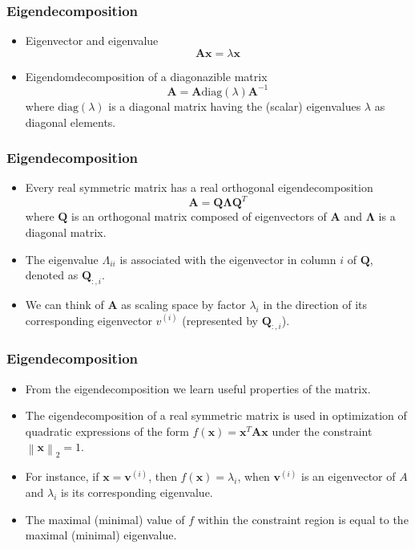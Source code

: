 \documentclass[notes]{beamer}          %
\newcommand{\vect}[1]{\bm{#1}}
\newcommand{\norm}[1]{\left\lVert#1\right\rVert}
\providecommand{\norm}[1]{\lVert#1\rVert}
\begin{document}
\begin{frame}
\frametitle{Eigendecomposition}
    \begin{itemize}
        \item Eigenvector and eigenvalue
        $$ \vect{A}\vect{x} = \lambda \vect{x}$$
        \item Eigendomdecomposition of a diagonazible matrix
        $$ \vect{A} = \vect{A} \mbox{diag}(\lambda) \vect{A}^{-1}$$
        where $\mbox{diag}(\lambda)$ is a diagonal matrix having the (scalar) eigenvalues $\lambda$ as diagonal elements.
    \end{itemize}

\end{frame}

\begin{frame}
\frametitle{Eigendecomposition}
    \begin{itemize}
        \item Every real symmetric matrix has a real orthogonal eigendecomposition
        $$ \vect{A} = \vect{Q} \vect{\Lambda} \vect{Q}^T $$
        where $\vect{Q}$ is an orthogonal matrix composed of eigenvectors of $\vect{A}$ and $\vect{\Lambda}$ is a diagonal matrix.
        \item The eigenvalue $\Lambda_{ii}$ is associated with the eigenvector in column $i$ of $\vect{Q}$, denoted as $\vect{Q}_{:,i}$.
        \item We can think of $\vect{A}$ as scaling space by factor $\lambda_i$ in the direction of its corresponding eigenvector $v^{(i)}$ (represented by $\vect{Q}_{:,i}$).
    \end{itemize}

\end{frame}

\begin{frame}
\frametitle{Eigendecomposition}
    \begin{itemize}
        \item From the eigendecomposition we learn useful properties of the matrix.
        \item The eigendecomposition of a real symmetric matrix is used in optimization of quadratic expressions of the form $f(\vect{x}) = \vect{x}^T \vect{A} \vect{x}$ under the constraint $\norm{\vect{x}}_2 = 1$.
        \item For instance, if $\vect{x}=\vect{v}^{(i)}$, then $f(\vect{x}) = \lambda_i$, when $\vect{v}^{(i)}$ is an eigenvector of $A$ and $\lambda_i$ is its corresponding eigenvalue.
        \item The maximal (minimal) value of $f$ within the constraint region is equal to the maximal (minimal) eigenvalue.
    \end{itemize}

\end{frame}
\end{document}
